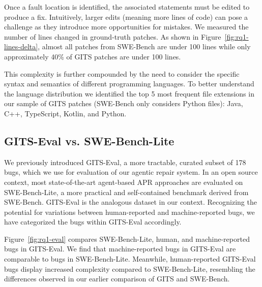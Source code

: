 Once a fault location is identified, the associated statements must be edited to produce a fix. Intuitively, larger edits (meaning more lines of code) can pose a challenge as they introduce more opportunities for mistakes. We measured the number of lines changed in ground-truth patches. As shown in Figure~\ref{fig:rq1-lines-delta},
almost all patches from SWE-Bench are under 100 lines while
only
approximately 40\% of GITS patches are under 100 lines.


This complexity is further compounded by the need to consider the specific syntax and semantics of different programming languages. To better understand the language distribution we identified the top 5 most frequent file extensions in our sample of GITS patches (SWE-Bench only considers Python files): Java, C++, TypeScript, Kotlin, and Python.




\vspace{-0.4cm}
\begin{center} 
\end{center}

\subsection{GITS-Eval vs. SWE-Bench-Lite}
We previously introduced GITS-Eval, a more tractable, curated subset of 178 bugs, which we use for evaluation of our agentic repair system.
In an open source context, most state-of-the-art agent-based APR approaches are evaluated on SWE-Bench-Lite, a more practical and self-contained benchmark derived from SWE-Bench. GITS-Eval is the analogous dataset in our context.
Recognizing the potential for variations between human-reported and machine-reported bugs, we have categorized the bugs within GITS-Eval accordingly. 

Figure~\ref{fig:rq1-eval} compares SWE-Bench-Lite, human, and machine-reported
bugs in GITS-Eval. We find that machine-reported bugs in GITS-Eval are comparable to bugs
in SWE-Bench-Lite. Meanwhile, human-reported GITS-Eval bugs display
increased complexity compared to SWE-Bench-Lite, resembling the differences
observed in our earlier comparison of GITS and SWE-Bench.


